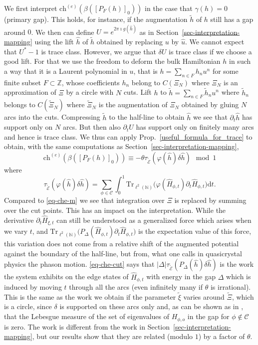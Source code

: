 \documentclass[11pt]{amsart}
\newcommand{\Z}{\mathbb{Z}}
\newcommand{\N}{\mathbb{N}}
\newcommand{\che}{\text{ch}^{(e)}}
\begin{document}
We first interpret $\che(\beta([P_F(h)]_0))$ in the case that $\gamma(h)=0$ (primary gap). 
This holds, for instance, if the augmentation $\tilde h$ of $h$ still has a gap around $0$. We then can define $U= e^{2\pi \imath g(\hat h)}$ as in Section~\ref{sec-interpretation-mapping} using the lift $\hat h$ of $\tilde h$ obtained by replacing $u$ by $\hat u$. We cannot expect that $U^*-1$ is trace class. However, we argue that $\delta U$ is trace class if we choose a good lift. For that we use the freedom to deform the bulk Hamiltonian $h$ in such a way that it is a Laurent polynomial in $u$, that is $h = \sum_{n\in F} h_n u^n$ for some finite subset $F\subset \Z$, whose coefficients  $h_n$ belong to $C(\Xi_N)$ where $\Xi_N$ is an approximation of $\Xi$ by a circle with $N$ cuts. Lift $h$ to $\tilde h=\sum_{n\in F} \tilde h_n u^n$ where $\tilde h_n$ belongs to  $C(\tilde \Xi_N)$ where $\tilde\Xi_N$ is the augmentation of $\Xi_N$ obtained by gluing $N$ arcs into the cuts. Compressing $\tilde h$ to the half-line to obtain $\hat h$ we see that $\partial_t \hat h$ has support only on $N$ arcs. But then also $\partial_t U$ has support only on finitely many arcs and hence is trace class. We thus can apply Prop.~\ref{useful_formula_for_trace} to obtain, with the same computations as Section~\ref{sec-interpretation-mapping}, 
$$\che(\beta([P_F(h)]_0)) \equiv - \theta \tau_{\tilde{\mathcal E}}(\varphi(\hat h) \delta \hat h) \mod{1} $$
where 
\begin{equation}\label{eq-che-cut}
\tau_{\tilde{\mathcal E}}(\varphi(\hat h) \delta \hat h)
=\sum_{\phi\in{\mathcal C}} \int_0^1   \mathrm{Tr}_{\ell^2(\N)}\big(\varphi(\hat H_{\phi,t})\partial_t \hat H_{\phi,t}\big) \mathrm{d}t. 
\end{equation}
Compared to \eqref{eq-che-m} we see that integration over $\Xi$ is replaced by summing over the cut points. This has an impact on the interpretation. While the derivative $\partial_t \hat{H}_{\xi,t}$ can still be understood as a generalized force which arises when we vary $t$, and 
$ \mathrm{Tr}_{\ell^2(\N)}\big(P_{\Delta}(\hat H_{\phi,t})\partial_t \hat H_{\phi,t}\big)$ is the expectation value of this force,
this variation does not come from a relative shift of the augmented potential against the boundary of the half-line, but from, what one calls in quasicrystal physics the phason motion. \eqref{eq-che-cut} says that 
$|\Delta|\tau_{\tilde{\mathcal E}}(P_\Delta(\hat h) \delta \hat h)$
is the work the system exhibits on the edge states of $\hat H_{\phi,t}$ with energy in the gap $\Delta$ which is induced by moving $t$ through all the arcs (even infinitely many if $\theta$ is irrational). This is the same as the work we obtain if the parameter $\tilde\xi$ varies around $\tilde\Xi$, which is a circle, since $\delta$ is supported on these arcs only and, as can be shown as in \cite{kellendonk_prodan}, that the Lebesgue measure of the set of eigenvalues of $H_{\phi,o}$ in the gap for $\phi\notin {\mathcal C}$ is zero. The work is different from the work in Section~\ref{sec-interpretation-mapping}, but our results show that they are related (modulo $1$) by a factor of $\theta$.
\end{document}
